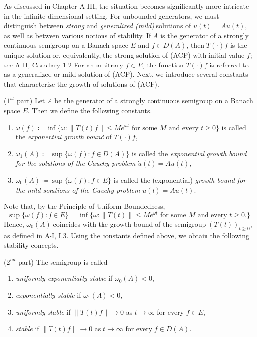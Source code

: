 As discussed in Chapter A-III, the situation becomes significantly more intricate in the infinite-dimensional setting. 
For unbounded generators, we must distinguish between \emph{strong} and \emph{generalized (mild)} solutions of $\dot{u}(t) = Au(t)$, as well as between various notions of stability.
If $A$ is the generator of a strongly continuous semigroup on a Banach space $E$ and $f \in D(A)$, then $T(\cdot)f$ is the unique solution or, equivalently, the strong solution of (ACP) with initial value $f$; see A-II, Corollary 1.2 
For an arbitrary $f \in E$, the function $T(\cdot)f$ is referred to as a generalized or mild solution of (ACP). 
Next, we introduce several constants that characterize the growth of solutions of (ACP).
\begin{definition}($1^{st}$ part)\label{def:a4-1.1} 
Let $A$ be the generator of a strongly continuous semigroup on a Banach space $E$. 
Then we define the following constants.
\begin{enumerate}[\upshape (i)]
\item $\omega(f) \coloneqq \inf\{\omega \colon \|T(t)f\| \leq Me^{\omega t} \text{ for some } M \text{ and every } t \geq 0\}$ is called the \emph{exponential growth bound} of $T(\cdot)f$,
\item $\omega_{1}(A) \coloneqq \sup\{\omega(f) \colon f \in D(A)\}$ is called the \emph{exponential growth bound for the solutions of the Cauchy problem} $\dot{u}(t) = Au(t)$,
\item $\omega_{0}(A) \coloneqq \sup\{\omega(f) \colon f \in E\}$ is called the (exponential) \emph{growth bound for the mild solutions of the Cauchy problem} $\dot{u}(t) = Au(t)$.
\end{enumerate}
\end{definition}
Note that, by the Principle of Uniform Boundedness, 
\[
\sup\{\omega(f) \colon f \in E\} 
= \inf \{ \omega \colon \|T(t)\| \leq Me^{\omega t} 
    \text{ for some $M$ and every $t \geq 0 $.}\}
\]
Hence, $\omega_{0}(A)$ coincides with the growth bound of the semigroup $(T(t))_{t \geq 0}$, as defined in A-I, I.3. 
Using the constants defined above, we obtain the following stability concepts.
\setcounter{theorem}{0}
\begin{definition}($2^{nd}$ part)
The semigroup is called
\begin{enumerate}
\item
\emph{uniformly exponentially stable} if $\omega_{0}(A) < 0$,
\item 
\emph{exponentially stable} if $\omega_{1}(A) < 0$,
\item 
\emph{uniformly stable} if $\|T(t)f\| \to 0$ as $t \to \infty$ for every $f \in E$,
\item 
\emph{stable} if $\|T(t)f\| \to 0$ as $t \to \infty$ for every $f \in D(A)$.
\end{enumerate}
\end{definition}
